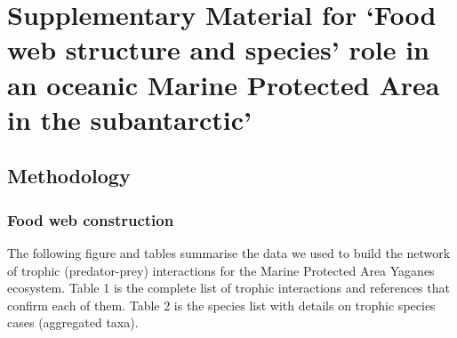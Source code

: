 \documentclass[
]{article}
\author{}
\date{\vspace{-2.5em}}
\begin{document}
\section{Supplementary Material for `Food web structure and species'
role in an oceanic Marine Protected Area in the
subantarctic'}\label{supplementary-material-for-food-web-structure-and-species-role-in-an-oceanic-marine-protected-area-in-the-subantarctic}

\subsection{Methodology}\label{methodology}

\subsubsection{Food web construction}\label{food-web-construction}

The following figure and tables summarise the data we used to build the
network of trophic (predator-prey) interactions for the Marine Protected
Area Yaganes ecosystem. Table 1 is the complete list of trophic
interactions and references that confirm each of them. Table 2 is the
species list with details on trophic species cases (aggregated taxa).
\end{document}
